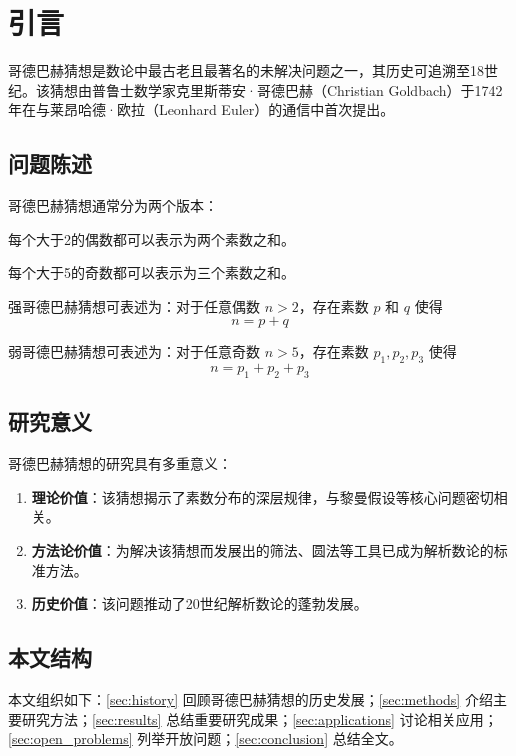 \section{引言}\label{sec:introduction}

哥德巴赫猜想是数论中最古老且最著名的未解决问题之一，其历史可追溯至18世纪。该猜想由普鲁士数学家克里斯蒂安·哥德巴赫（Christian Goldbach）于1742年在与莱昂哈德·欧拉（Leonhard Euler）的通信中首次提出。

\subsection{问题陈述}

哥德巴赫猜想通常分为两个版本：

\begin{definition}[强哥德巴赫猜想]
    每个大于2的偶数都可以表示为两个素数之和。
\end{definition}

\begin{definition}[弱哥德巴赫猜想]
    每个大于5的奇数都可以表示为三个素数之和。
\end{definition}

强哥德巴赫猜想可表述为：对于任意偶数 $n > 2$，存在素数 $p$ 和 $q$ 使得
\begin{equation}
    n = p + q
\end{equation}

弱哥德巴赫猜想可表述为：对于任意奇数 $n > 5$，存在素数 $p_1, p_2, p_3$ 使得
\begin{equation}
    n = p_1 + p_2 + p_3
\end{equation}

\subsection{研究意义}

哥德巴赫猜想的研究具有多重意义：

\begin{enumerate}[label=(\arabic*)]
    \item \textbf{理论价值}：该猜想揭示了素数分布的深层规律，与黎曼假设等核心问题密切相关\cite{hardy1979introduction}。
    \item \textbf{方法论价值}：为解决该猜想而发展出的筛法、圆法等工具已成为解析数论的标准方法。
    \item \textbf{历史价值}：该问题推动了20世纪解析数论的蓬勃发展。
\end{enumerate}

\subsection{本文结构}

本文组织如下：\cref{sec:history} 回顾哥德巴赫猜想的历史发展；\cref{sec:methods} 介绍主要研究方法；\cref{sec:results} 总结重要研究成果；\cref{sec:applications} 讨论相关应用；\cref{sec:open_problems} 列举开放问题；\cref{sec:conclusion} 总结全文。
